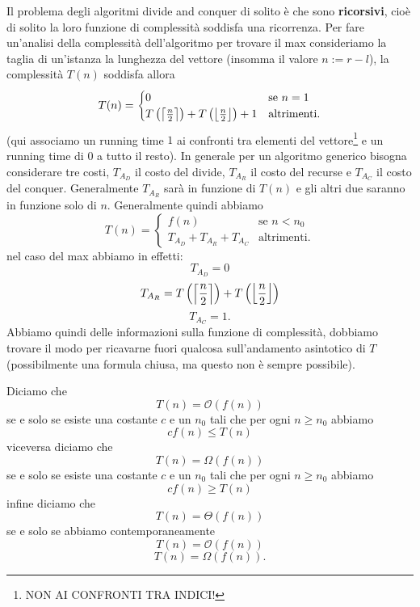 \documentclass[11pt]{scrartcl}
\newcommand{\bigo}[1]{\mathcal{O}\!\left(#1\right)}
\newcommand{\bigomega}[1]{\Omega\!\left(#1\right)}
\newcommand{\bigtheta}[1]{\Theta\!\left(#1\right)}
\begin{document}
	Il problema degli algoritmi divide and conquer di solito è che sono \textbf{ricorsivi}, cioè di solito la loro funzione di complessità soddisfa una ricorrenza. Per fare un'analisi della complessità dell'algoritmo per trovare il max consideriamo la taglia di un'istanza la lunghezza del vettore (insomma il valore $n:=r-l$), la complessità $T(n)$ soddisfa allora
	$$T(n)=
	\begin{cases}
		0 & \text{se $n=1$} \\
		T\left(\left\lceil \frac{n}{2} \right\rceil\right)+T\left(\left\lfloor \frac{n}{2} \right\rfloor\right)+1 & \text{altrimenti.}
	\end{cases}
	$$
	(qui associamo un running time $1$ ai confronti tra elementi del vettore\footnote{NON AI CONFRONTI TRA INDICI!} e un running time di $0$ a tutto il resto). In generale per un algoritmo generico bisogna considerare tre costi, $T_{A_D}$ il costo del divide, $T_{A_R}$ il costo del recurse e $T_{A_C}$ il costo del conquer. Generalmente $T_{A_R}$ sarà in funzione di $T(n)$ e gli altri due saranno in funzione solo di $n$. Generalmente quindi abbiamo
	$$T(n)=
	\begin{cases}
		f(n) & \text{se $n<n_0$} \\
		T_{A_D}+T_{A_R}+T_{A_C} & \text{altrimenti.}
	\end{cases}
	$$
	nel caso del max abbiamo in effetti:
	$$T_{A_D}=0$$
	$$T_{A_R}=T\left(\left\lceil \frac{n}{2} \right\rceil\right)+T\left(\left\lfloor \frac{n}{2} \right\rfloor\right)$$
	$$T_{A_C}=1.$$
	Abbiamo quindi delle informazioni sulla funzione di complessità, dobbiamo trovare il modo per ricavarne fuori qualcosa sull'andamento asintotico di $T$ (possibilmente una formula chiusa, ma questo non è sempre possibile).
	\begin{definition}
		Diciamo che 
		$$T(n)=\bigo{f(n)}$$
		se e solo se esiste una costante $c$ e un $n_0$ tali che per ogni $n\ge n_0$ abbiamo
		$$cf(n)\le T(n)$$
		viceversa diciamo che 
		$$T(n)=\bigomega{f(n)}$$
		se e solo se esiste una costante $c$ e un $n_0$ tali che per ogni $n\ge n_0$ abbiamo
		$$cf(n)\ge T(n)$$
		infine diciamo che 
		$$T(n)=\bigtheta{f(n)}$$
		se e solo se abbiamo contemporaneamente
		$$T(n)=\bigo{f(n)}$$
		$$T(n)=\bigomega{f(n)}.$$
	\end{definition}
\end{document}
